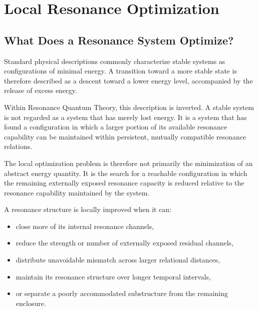 \documentclass[11pt,a4paper]{article}
\begin{document}



\section{Local Resonance Optimization}
\label{chap:local_resonance_optimization}


\subsection{What Does a Resonance System Optimize?}
\label{sec:resonance_optimization_objective}

Standard physical descriptions commonly characterize stable systems as configurations of minimal energy. A transition toward a more stable state is therefore described as a descent toward a lower energy level, accompanied by the release of excess energy.

Within Resonance Quantum Theory, this description is inverted. A stable system is not regarded as a system that has merely lost energy. It is a system that has found a configuration in which a larger portion of its available resonance capability can be maintained within persistent, mutually compatible resonance relations.

The local optimization problem is therefore not primarily the minimization of an abstract energy quantity. It is the search for a reachable configuration in which the remaining externally exposed resonance capacity is reduced relative to the resonance capability maintained by the system.

A resonance structure is locally improved when it can:

\begin{itemize}
    \item close more of its internal resonance channels,
    \item reduce the strength or number of externally exposed residual channels,
    \item distribute unavoidable mismatch across larger relational distances,
    \item maintain its resonance structure over longer temporal intervals,
    \item or separate a poorly accommodated substructure from the remaining enclosure.
\end{itemize}
\end{document}
